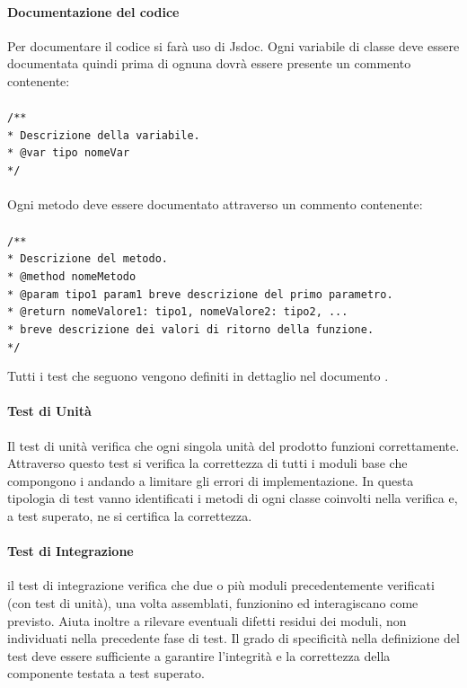 \documentclass[12pt,a4paper]{article}
\begin{document}
\paragraph{Documentazione del codice}
Per documentare il codice  si farà uso di Jsdoc. Ogni variabile di classe deve essere documentata quindi prima di ognuna dovrà essere presente un commento contenente:\\\\
\texttt{/**\\
	* Descrizione della variabile.\\
	* @var {tipo} nomeVar\\
	*/\\
}\\
Ogni metodo deve essere documentato attraverso un commento contenente:\\\\
\texttt{/**\\
	* Descrizione del metodo.\\
	* @method nomeMetodo\\
	* @param {tipo1} param1 breve descrizione del primo parametro.\\
	* @return {{nomeValore1: tipo1, nomeValore2: tipo2, ...}} \\
	* breve descrizione dei valori di ritorno della funzione.\\
	*/\\
}

\label{test}

Tutti i test che seguono vengono definiti in dettaglio nel documento \PdQ{}.

\paragraph{Test di Unità}

Il test di unità verifica che ogni singola unità del prodotto  funzioni correttamente.
Attraverso questo test si verifica la correttezza di tutti i moduli base che compongono i  andando a limitare gli errori di implementazione.
In questa tipologia di test vanno identificati i metodi di ogni classe coinvolti nella verifica e, a test superato, ne si certifica la correttezza.

\paragraph{Test di Integrazione}

il test di integrazione verifica che due o più moduli precedentemente verificati (con test di unità), una volta assemblati, funzionino ed interagiscano come previsto. Aiuta inoltre a rilevare eventuali difetti residui dei moduli, non individuati nella precedente fase di test.
Il grado di specificità nella definizione del test deve essere sufficiente a garantire l'integrità e la correttezza della componente testata a test superato.
\end{document}
